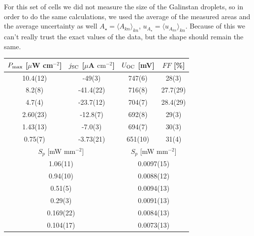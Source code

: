 \documentclass[a4paper,10pt,twocolumn]{article}
\begin{document}
\begin{extract*}
For this set of cells we did not measure the size of the Galinstan droplets, so in order to do the same calculations, we used the average of the measured areas and the average uncertainty as well $A_\star = \langle A_{kn} \rangle_{kn}$, $u_{A_\star} = \langle u_{A_{kn}}  \rangle_{kn}$. Because of this we can't really trust the exact values of the data, but the shape should remain the same.
\begin{table}[]
	\begin{tabular}{@{}cccc@{}}
		\toprule
		$P_{\text{max}}$ [$\mu$W cm$^{-2}$] & $j_{\text{SC}}$ [$\mu$A $\mathrm{cm}^{-2}$] & $U_{\text{OC}}$ [mV]          & $FF$ [\%]         \\ \midrule
		10.4(12)                   & -49(3)                             & 747(6)               & 28(3)             \\
		8.2(8)                     & -41.4(22)                          & 716(8)               & 27.7(29)          \\
		4.7(4)                     & -23.7(12)                          & 704(7)               & 28.4(29)          \\
		2.60(23)                   & -12.8(7)                           & 692(8)               & 29(3)             \\
		1.43(13)                   & -7.0(3)                            & 694(7)               & 30(3)             \\
		0.75(7)                    & -3.73(21)                          & 651(10)              & 31(4)             \\ \midrule
		\multicolumn{2}{c}{$S_p$ [mW mm$^{-2}$]}                        & \multicolumn{2}{c}{$S_p$ [mW mm$^{-2}$]} \\ \midrule
		\multicolumn{2}{c}{1.06(11)}                                    & \multicolumn{2}{c}{0.0097(15)}           \\
		\multicolumn{2}{c}{0.94(10)}                                    & \multicolumn{2}{c}{0.0088(12)}           \\
		\multicolumn{2}{c}{0.51(5)}                                     & \multicolumn{2}{c}{0.0094(13)}           \\
		\multicolumn{2}{c}{0.29(3)}                                     & \multicolumn{2}{c}{0.0091(13)}           \\
		\multicolumn{2}{c}{0.169(22)}                                   & \multicolumn{2}{c}{0.0084(13)}           \\
		\multicolumn{2}{c}{0.104(17)}                                   & \multicolumn{2}{c}{0.0073(13)}           \\ \bottomrule
	\end{tabular}
\end{table}



\end{extract*}
\end{document}
